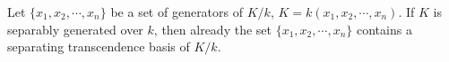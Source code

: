 Let $\{x_1, x_2, \cdots, x_n\}$ be a set of generators of $K/k$, $K = k(x_1, x_2, \cdots, x_n)$. If $K$ is separably generated over $k$, then already the set $\{x_1, x_2, \cdots, x_n\}$ contains a separating transcendence basis of $K/k$.
